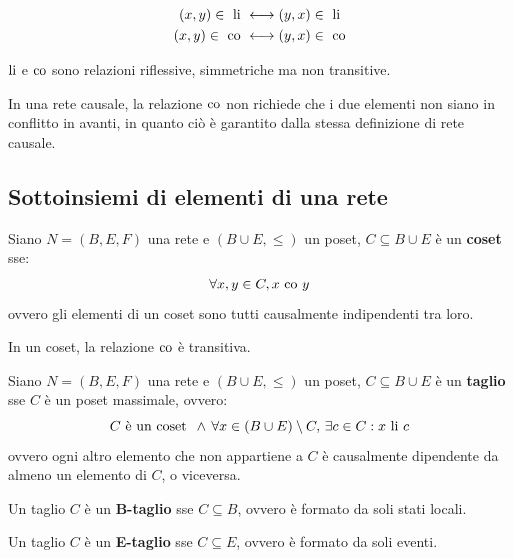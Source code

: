 \begin{rem}
    \begin{align*}
        (x,y) \in \textnormal{ li } &\longleftrightarrow (y,x) \in \textnormal{ li}\\
        (x,y) \in \textnormal{ co } &\longleftrightarrow (y,x) \in \textnormal{ co}
    \end{align*}
\end{rem}
\begin{rem}
    $\textnormal{li}$ e $\textnormal{co}$ sono relazioni riflessive, simmetriche ma non transitive.
\end{rem}
\begin{rem}
    In una rete causale, la relazione $\textnormal{co}$ non richiede che i due elementi non siano in conflitto in avanti, in quanto ciò è garantito dalla stessa definizione di rete causale.
\end{rem}

\subsection{Sottoinsiemi di elementi di una rete}
\begin{defn}
    Siano $N = (B, E, F)$ una rete e $(B \cup E, \le)$ un poset, $C \subseteq B \cup E$ è un \textbf{coset} sse:
    \[
        \forall x, y \in C, x \textnormal{ co } y
    \]
    ovvero gli elementi di un coset sono tutti causalmente indipendenti tra loro. 
\end{defn}

\begin{rem}
    In un coset, la relazione $\textnormal{co}$ è transitiva.
\end{rem}

\begin{defn}
    Siano $N = (B, E, F)$ una rete e $(B \cup E, \le)$ un poset, $C \subseteq B \cup E$ è un \textbf{taglio} sse $C$ è un poset massimale, ovvero:
    \[
        C \textnormal{ è un coset } \, \land \, \forall x \in (B \cup E) \setminus C, \, \exists c \in C : x \textnormal{ li } c
    \]
    ovvero ogni altro elemento che non appartiene a $C$ è causalmente dipendente da almeno un elemento di $C$, o viceversa.
\end{defn}

\begin{defn}
    Un taglio $C$ è un \textbf{B-taglio} sse $C \subseteq B$, ovvero è formato da soli stati locali.
\end{defn}

\begin{defn}
    Un taglio $C$ è un \textbf{E-taglio} sse $C \subseteq E$, ovvero è formato da soli eventi.
\end{defn}

